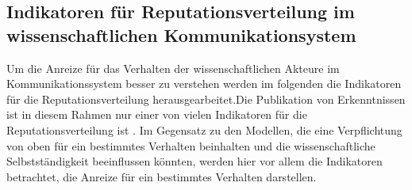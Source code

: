 \subsection{Indikatoren für Reputationsverteilung im wissenschaftlichen Kommunikationsystem}

Um die Anreize für das Verhalten der wissenschaftlichen Akteure im Kommunikationssystem besser zu verstehen werden im folgenden die Indikatoren für die Reputationsverteilung herausgearbeitet.Die Publikation von Erkenntnissen ist in diesem Rahmen nur einer von vielen Indikatoren für die Reputationsverteilung ist \cite{hirschauer2004peer}. Im Gegensatz zu den Modellen, die eine Verpflichtung von oben für ein bestimmtes Verhalten beinhalten und die wissenschaftliche Selbstständigkeit beeinflussen könnten, werden hier vor allem die Indikatoren betrachtet, die Anreize für ein bestimmtes Verhalten darstellen.

